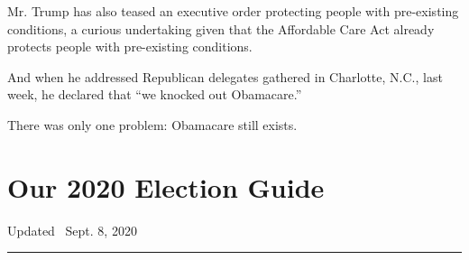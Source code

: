 Mr. Trump has also teased an executive order protecting people with
pre-existing conditions, a curious undertaking given that the Affordable
Care Act already protects people with pre-existing conditions.

And when he addressed Republican delegates gathered in Charlotte, N.C.,
last week, he declared that ``we knocked out Obamacare.''

There was only one problem: Obamacare still exists.

\hypertarget{our-2020-election-guide}{%
\section{Our 2020 Election Guide}\label{our-2020-election-guide}}

Updated ~Sept. 8, 2020

\begin{center}\rule{0.5\linewidth}{\linethickness}\end{center}

